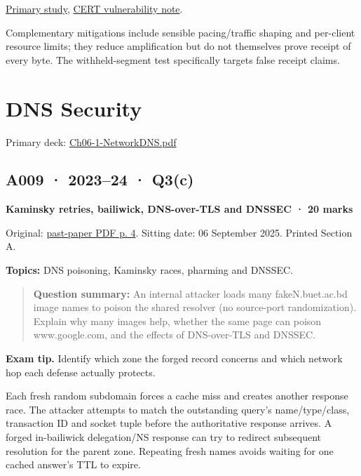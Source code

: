 \documentclass[11pt,a4paper]{article}
\begin{document}
\href{https://drum.lib.umd.edu/items/d435007a-3809-4c75-8e4f-85ae20c5d5e7}{Primary study},\allowbreak{} \href{https://www.kb.cert.org/vuls/id/102014}{CERT vulnerability note}.


Complementary mitigations include sensible pacing/\allowbreak{}traffic shaping and per-client resource limits; they reduce amplification but do not themselves prove receipt of every byte. The withheld-segment test specifically targets false receipt claims.



\clearpage
\section{DNS Security}

Primary deck: \href{../slides/Ch06-1-NetworkDNS.pdf}{Ch06-1-NetworkDNS.\allowbreak{}pdf}




\subsection{A009 · 2023–24 · Q3(c)}\label{a009}

\textbf{Kaminsky retries,\allowbreak{} bailiwick,\allowbreak{} DNS-over-TLS and DNSSEC · 20 marks}


Original: \href{../../CSE405-Security_Merged.pdf\#page=4}{past-paper PDF p. 4}. Sitting date: 06 September 2025. Printed Section A.


\textbf{Topics:} DNS poisoning,\allowbreak{} Kaminsky races,\allowbreak{} pharming and DNSSEC.



\begin{quote}\small

\textbf{Question summary:} An internal attacker loads many fakeN.\allowbreak{}buet.\allowbreak{}ac.\allowbreak{}bd image names to poison the shared resolver (no source-port randomization). Explain why many images help,\allowbreak{} whether the same page can poison www.\allowbreak{}google.\allowbreak{}com,\allowbreak{} and the effects of DNS-over-TLS and DNSSEC.



\end{quote}


{\color{ForestGreen}\textbf{Exam tip.} Identify which zone the forged record concerns and which network hop each defense actually protects.}


Each fresh random subdomain forces a cache miss and creates another response race. The attacker attempts to match the outstanding query's name/\allowbreak{}type/\allowbreak{}class,\allowbreak{} transaction ID and socket tuple before the authoritative response arrives. A forged in-bailiwick delegation/\allowbreak{}NS response can try to redirect subsequent resolution for the parent zone. Repeating fresh names avoids waiting for one cached answer's TTL to expire.
\end{document}
